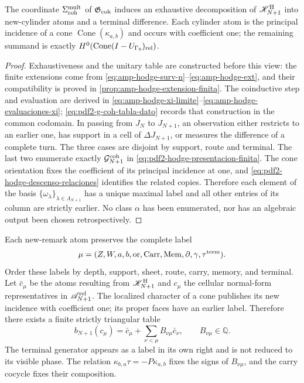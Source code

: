 \begin{proposition}
\label{prop:pdf2-hodge-exhaustividad-owner}
The coordinate $\Sigma_{\rm coh}^{\rm mult}$ of
$\mathfrak G_{\rm coh}$ induces an exhaustive decomposition of
$\mathscr K^{\rm H}_{N+1}$ into new-cylinder atoms and a terminal
difference. Each cylinder atom is the principal incidence of a cone
$\operatorname{Cone}(\kappa_{a,b})$ and occurs with coefficient one; the
remaining summand is exactly
$H^0(\operatorname{Cone}(I-U_{\Gamma_9})_{\rm rel})$.
\end{proposition}

\begin{proof}
Exhaustiveness and the unitary table are constructed before this view: the
finite extensions come from
\eqref{eq:amp-hodge-surv-n}--\eqref{eq:amp-hodge-ext}, and their compatibility is
proved in \cref{prop:amp-hodge-extension-finita}. The coinductive step and
evaluation are derived in
\eqref{eq:amp-hodge-xi-limite}--\eqref{eq:amp-hodge-evaluaciones-xi};
\eqref{eq:pdf2-g-coh-tabla-dato} records that construction in the common
codomain. In passing from $J_N$ to $J_{N+1}$, an observation either
restricts to an earlier one, has support in a cell of
$\Delta J_{N+1}$, or measures the difference of a complete turn. The
three cases are disjoint by support, route and terminal. The last two
enumerate exactly \(\mathcal G_{N+1}^{\rm coh}\) in
\eqref{eq:pdf2-hodge-presentacion-finita}. The cone orientation fixes the coefficient
of its principal incidence at one, and
\eqref{eq:pdf2-hodge-descenso-relaciones} identifies the related copies.
Therefore each element of the basis
\(\{\omega_\lambda\}_{\lambda\in\Lambda_{N+1}}\) has a unique maximal
label and all other entries of its column are strictly earlier.
No class \(\alpha\) has been enumerated, nor has an algebraic output
been chosen retrospectively.
\end{proof}

Each new-remark atom preserves the complete label
\[
 \mu=(Z,W,a,b,\operatorname{or},\operatorname{Carr},
       \operatorname{Mem},\partial,\gamma,\tau^{\rm term}).
\]
Order these labels by depth, support, sheet, route, carry,
memory, and terminal. Let $\bar c_\mu$ be the atoms resulting from
$\mathscr K^{\rm H}_{N+1}$ and $c_\mu$ the cellular normal-form representatives in
$\mathscr A_{N+1}^{\rm rel}$. The localized character of a
cone publishes its new incidence with coefficient one; its proper faces
have an earlier label. Therefore there exists a finite strictly
triangular table
\begin{equation}\label{eq:pdf2-hodge-tabla-triangular}
 b_{N+1}(c_\mu)
 =\bar c_\mu+\sum_{\nu<\mu}B_{\nu\mu}\bar c_\nu,
 \qquad B_{\nu\mu}\in\mathbb Q.
\end{equation}
The terminal generator appears as a label in its own right and is not reduced to its
visible phase. The relation
$\kappa_{b,a}\tau=-P\kappa_{a,b}$ fixes the signs of
$B_{\nu\mu}$, and the carry cocycle fixes their composition.

